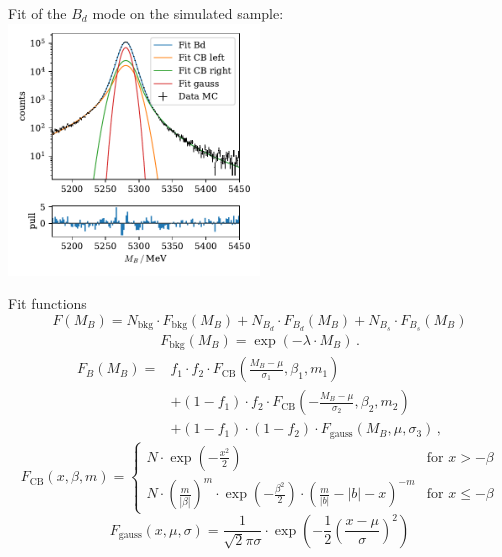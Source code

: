 \documentclass[aspectratio=1610, 10pt]{beamer}
\begin{document}
\begin{frame}{Fit of the $B_d$ mode on the simulated sample:}
  \centering
  \includegraphics[width=0.5\textwidth]{images/fit_mc.pdf}
\end{frame}

\begin{frame}{Fit functions}
  \begin{equation*}
    F(M_B) = N_\text{bkg} \cdot F_\text{bkg}(M_B) + N_{B_d} \cdot F_{B_d}(M_B) + N_{B_s} \cdot F_{B_s}(M_B)
  \end{equation*}
  \begin{align*}
    F_\text{bkg}(M_B) = \exp(-\lambda \cdot M_B) \, .
  \end{align*}
  \begin{align*}
    F_B(M_B) = &f_1 \cdot f_2 \cdot F_\text{CB}\left(\frac{M_B-\mu}{\sigma_1}, \beta_1, m_1\right) \nonumber\\
                &+ (1-f_1) \cdot f_2 \cdot F_\text{CB}\left(-\frac{M_B-\mu}{\sigma_2}, \beta_2, m_2\right) \nonumber\\
                &+ (1-f_1) \cdot (1-f_2) \cdot F_\text{gauss}\left(M_B,\mu,\sigma_3\right) \, , \label{eqn:FB}
  \end{align*}
  \begin{equation*}
    F_\text{CB}(x,\beta,m) = 
    \begin{cases}
        N \cdot \exp(-\frac{x^2}{2}) & \text{for } x > -\beta \\
        N \cdot \left(\frac{m}{|\beta|}\right)^m \cdot \exp\left(-\frac{\beta^2}{2}\right) \cdot \left(\frac{m}{|b|}-|b| - x\right)^{-m} & \text{for } x \leq -\beta
    \end{cases}
  \end{equation*}
  \begin{equation*}
    F_\text{gauss}\left(x,\mu,\sigma\right) = \frac{1}{\sqrt{2}\pi\sigma} \cdot \exp\left(-\frac{1}{2}\left(\frac{x-\mu}{\sigma}\right)^2\right)
  \end{equation*}
\end{frame}
\end{document}
